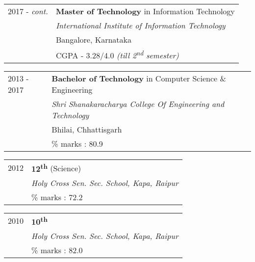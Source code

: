 \documentclass[10pt]{article}
\newcommand{\shadethis}[1]{ \begin{snugshade}#1\end{snugshade}}
\begin{document}
    \begin{description}[style=nextline]



        \shadethis{\item{}}    
            \begin{tabular}{p{2cm}|p{8cm}}
            {2017 - \emph{cont.}} & \textbf{Master of Technology} in Information Technology\\
                      & \emph{International Institute of Information Technology}\\
                    & Bangalore, Karnataka \\
                    & {CGPA - 3.28/4.0 \emph{(till 2\textsuperscript{nd} semester)}} 
            \end{tabular}
            
            \begin{tabular}{p{2cm}|p{10.5cm}}

            {2013 - 2017}     & \textbf{Bachelor of Technology} in Computer Science \& Engineering \\
                 & \emph{Shri Shanakaracharya College Of Engineering and Technology} \\
                & Bhilai, Chhattisgarh\\
                & {\% marks : 80.9}        
            \end{tabular}
        
            
            \begin{tabular}{p{2cm}|p{10.5cm}}
                
                {2012}     & \textbf{12\textsuperscript{th}} (Science) \\
                & \emph{Holy Cross Sen. Sec. School, Kapa, Raipur} \\
                & { \% marks : 72.2}        
            \end{tabular}
            
            \begin{tabular}{p{2cm}|p{10.5cm}}
                
                {2010}     & \textbf{10\textsuperscript{th}}  \\
                & \emph{Holy Cross Sen. Sec. School, Kapa, Raipur} \\
                & { \% marks : 82.0}        
            \end{tabular}
            

\end{description}
\end{document}
